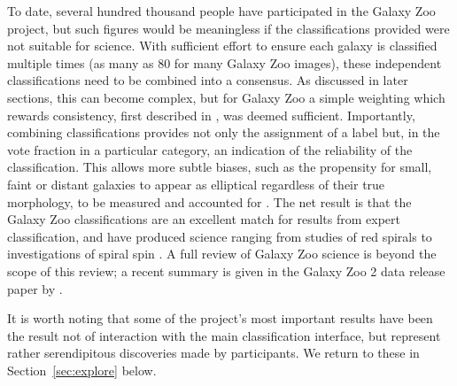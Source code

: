 \documentclass{ar2e}
\def\Sref#1{Section~\ref{#1}\xspace}
\begin{document}

To date, several hundred thousand people 
have participated in the Galaxy Zoo project, but such
figures would be meaningless if the classifications provided were not suitable
for science. With sufficient effort to ensure each galaxy is classified multiple
times (as many as 80 for many Galaxy Zoo images), these independent
classifications need to be combined into a consensus. As discussed in later
sections, this can become complex, but for Galaxy Zoo a simple weighting which
rewards consistency, first described in \citet{Land++2008}, was deemed sufficient.
Importantly, combining classifications provides not only the assignment of a
label but, in the vote fraction in a particular category, an indication of the
reliability of the classification. This allows more subtle biases, such as the
propensity for small, faint or distant galaxies to appear as elliptical
regardless of their true morphology, to be measured and accounted for
\citep[see][]{Bamford++2009}. The net result is that the Galaxy Zoo classifications
are an excellent match for results from expert classification, and have produced
science ranging from studies of red spirals \citep{Masters++2010} to investigations
of spiral spin \citep{Slosar++2009}.
A full review of Galaxy Zoo science is beyond the scope of this review; a recent
summary is given in the Galaxy Zoo 2 data release paper by \citet{Willett++2013}.

It is worth noting that some of the project's most important results
have been the result not of interaction with the main classification interface,
but represent rather serendipitous discoveries made by participants. 
We return to these in \Sref{sec:explore} below.



\end{document}
